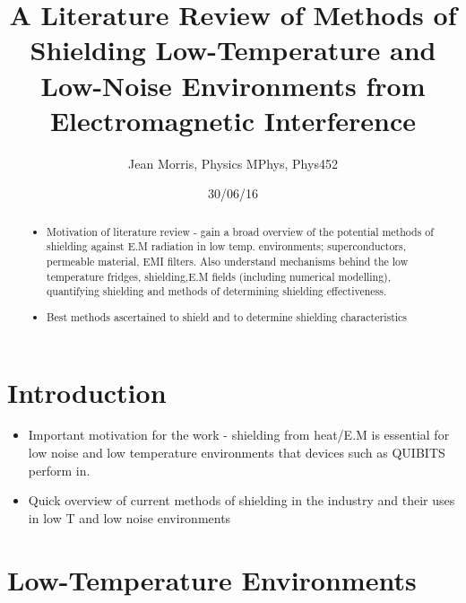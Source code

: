 \documentclass[a4paper,12pt]{article}
\begin{document}
\title{A Literature Review of Methods of Shielding Low-Temperature and Low-Noise Environments from Electromagnetic Interference}
\author{Jean Morris, Physics MPhys, Phys452 }
\date{30/06/16}



\maketitle

\begin{abstract}

\begin{itemize}
\item Motivation of literature review - gain a broad overview of the potential methods of shielding against E.M radiation in low temp. environments; superconductors, permeable material, EMI filters. Also understand mechanisms behind the low temperature fridges, shielding,E.M fields (including numerical modelling), quantifying shielding and methods of determining shielding effectiveness.  
\item Best methods ascertained to shield and to determine shielding characteristics 
\end{itemize}

\end{abstract}

\tableofcontents
\newpage

\section{Introduction}
  \begin{itemize}
  \item Important motivation for the work - shielding from heat/E.M is essential for low noise and low temperature environments that devices such as QUIBITS perform in. 
  \item Quick overview of current methods of shielding in the industry and their uses in low T and low noise environments

  \end{itemize}
  
  

       
\section{Low-Temperature Environments}
\end{document}
